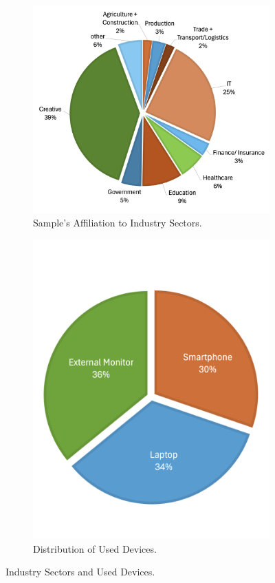 \documentclass[
  a4paper,  %
  twoside,  %
  bibliography=totoc,
  headsepline,
  cleardoublepage=empty,
  parskip=half,
  draft=false
]{scrbook}
\begin{document}
\begin{figure}[h]
  \centering
  \begin{subfigure}{0.58\textwidth}
    \includegraphics[width=\linewidth]{graphics/statistics/piechart-sectors.png}
    \caption{Sample's Affiliation to Industry Sectors.}
    \label{fig:piechart-sectors}
  \end{subfigure}
  \begin{subfigure}{0.38\textwidth}
    \includegraphics[width=\linewidth]{graphics/statistics/piechart-devices.png}
    \caption{Distribution of Used Devices.}
    \label{fig:piechart-devices}
  \end{subfigure}
  \caption{Industry Sectors and Used Devices.}
\end{figure}
\end{document}
